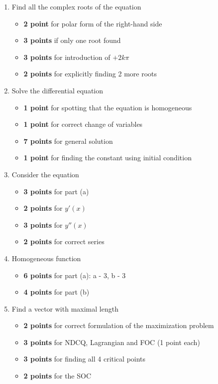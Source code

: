 \documentclass[12pt]{article} %
\theoremstyle{definition} %
\begin{document}
\begin{enumerate}
\item Find all the complex roots of the equation
\begin{itemize}
    \item \textbf{2 point} for polar form of the right-hand side
    \item \textbf{3 points} if only one root found
    \item \textbf{3 points} for introduction of $+2k\pi$
    \item \textbf{2 points} for explicitly finding 2 more roots
\end{itemize}

\item Solve the differential equation
\begin{itemize}
    \item \textbf{1 point} for spotting that the equation is homogeneous
    \item \textbf{1 point} for correct change of variables
    \item \textbf{7 points} for general solution
    \item \textbf{1 point} for finding the constant using initial condition
\end{itemize}

\item Consider the equation
\begin{itemize}
    \item \textbf{3 points} for part (a)
    \item \textbf{2 points} for $y'(x)$
    \item \textbf{3 points} for $y''(x)$
    \item \textbf{2 points} for correct series
\end{itemize}

\item Homogeneous function
\begin{itemize}
    \item \textbf{6 points} for part (a): a - 3, b - 3
    \item \textbf{4 points} for part (b)
\end{itemize}

\item Find a vector with maximal length
\begin{itemize}
    \item \textbf{2 points} for correct formulation of the maximization problem
    \item \textbf{3 points} for NDCQ, Lagrangian and FOC (1 point each)
    \item \textbf{3 points} for finding all 4 critical points
    \item \textbf{2 points} for the SOC
\end{itemize}


\end{enumerate}
\end{document}
